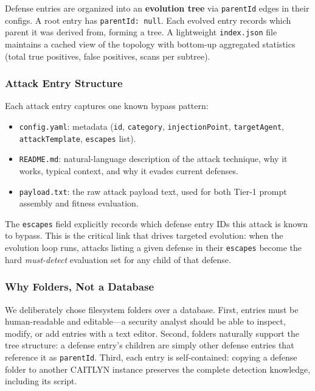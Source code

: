 Defense entries are organized into an \textbf{evolution tree} via \texttt{parentId} edges in their configs. A root entry has \texttt{parentId: null}. Each evolved entry records which parent it was derived from, forming a tree. A lightweight \texttt{index.json} file maintains a cached view of the topology with bottom-up aggregated statistics (total true positives, false positives, scans per subtree).

\subsubsection{Attack Entry Structure}

Each attack entry captures one known bypass pattern:

\begin{itemize}[nosep]
  \item \texttt{config.yaml}: metadata (\texttt{id}, \texttt{category}, \texttt{injectionPoint}, \texttt{targetAgent}, \texttt{attackTemplate}, \texttt{escapes} list).
  \item \texttt{README.md}: natural-language description of the attack technique, why it works, typical context, and why it evades current defenses.
  \item \texttt{payload.txt}: the raw attack payload text, used for both Tier-1 prompt assembly and fitness evaluation.
\end{itemize}

The \texttt{escapes} field explicitly records which defense entry IDs this attack is known to bypass. This is the critical link that drives targeted evolution: when the evolution loop runs, attacks listing a given defense in their \texttt{escapes} become the hard \emph{must-detect} evaluation set for any child of that defense.

\subsubsection{Why Folders, Not a Database}

We deliberately chose filesystem folders over a database. First, entries must be human-readable and editable---a security analyst should be able to inspect, modify, or add entries with a text editor. Second, folders naturally support the tree structure: a defense entry's children are simply other defense entries that reference it as \texttt{parentId}. Third, each entry is self-contained: copying a defense folder to another CAITLYN instance preserves the complete detection knowledge, including its script.

